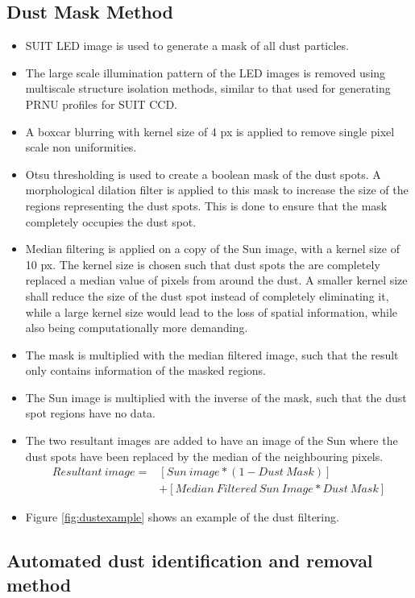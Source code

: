 \documentclass[11pt,a4paper]{article}
\begin{document}
	\subsection{Dust Mask Method}
	\begin{itemize}
		\item SUIT LED image is used to generate a mask of all dust particles.
		\item The large scale illumination pattern of the LED images is removed using multiscale structure isolation methods, similar to that used for generating PRNU profiles for SUIT CCD.
		\item A boxcar blurring with kernel size of 4 px is applied to remove single pixel scale non uniformities.
		\item Otsu thresholding is used to create a boolean mask of the dust spots. A morphological dilation filter is applied to this mask to increase the size of the regions representing the dust spots. This is done to ensure that the mask completely occupies the dust spot.
		\item Median filtering is applied on a copy of the Sun image, with a kernel size of 10 px. The kernel size is chosen such that dust spots the are completely replaced a median value of pixels from around the dust. A smaller kernel size shall reduce the size of the dust spot instead of completely eliminating it, while a large kernel size would lead to the loss of spatial information, while also being computationally more demanding.
		\item The mask is multiplied with the median filtered image, such that the result only contains information of the masked regions.
		\item The Sun image is multiplied with the inverse of the mask, such that the dust spot regions have no data.
		\item The two resultant images are added to have an image of the Sun where the dust spots have been replaced by the median of the neighbouring pixels.
		\begin{align*}
			Resultant~image = &[Sun~image * (1-Dust~Mask) ]\\
			&+ [Median~Filtered~Sun~Image * Dust~Mask]
		\end{align*}
		\item Figure \ref{fig:dustexample} shows an example of the dust filtering.
	\end{itemize}
	\subsection{Automated dust identification and removal method}
	
\end{document}
